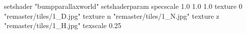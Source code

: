 setshader "bumpparallaxworld"
setshaderparam specscale 1.0 1.0 1.0
    texture 0 "remaster/tiles/1_D.jpg"
    texture n "remaster/tiles/1_N.jpg"
    texture z "remaster/tiles/1_H.jpg"
    texscale 0.25